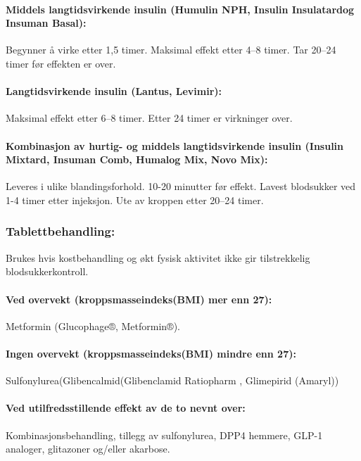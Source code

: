 					\paragraph{Middels langtidsvirkende insulin (Humulin NPH\textregistered, Insulin Insulatard\textregistered og Insuman Basal\textregistered):\\}Begynner å virke etter 1,5 timer. Maksimal effekt etter 4–8 timer. Tar 20–24 timer før effekten er over.

					\paragraph{Langtidsvirkende insulin (Lantus\textregistered, Levimir\textregistered):\\}Maksimal effekt etter 6–8 timer. Etter 24 timer er virkninger over.

					\paragraph{Kombinasjon av hurtig- og middels langtidsvirkende insulin (Insulin Mixtard\textregistered, Insuman Comb\textregistered, Humalog Mix, Novo Mix):\\} Leveres i ulike blandingsforhold. 10-20 minutter før effekt. Lavest blodsukker ved 1-4 timer etter injeksjon. Ute av kroppen etter 20–24 timer.

				\subsubsection{Tablettbehandling:} 
					Brukes hvis kostbehandling og økt fysisk aktivitet ikke gir tilstrekkelig blodsukkerkontroll.

					\paragraph{Ved overvekt (kroppsmasseindeks(BMI) mer enn 27):\\}Metformin (Glucophage®, Metformin®).

					\paragraph{Ingen overvekt (kroppsmasseindeks(BMI) mindre enn 27):\\}Sulfonylurea(Glibencalmid(Glibenclamid Ratiopharm \textregistered, Glimepirid (Amaryl\textregistered))

					\paragraph{Ved utilfredsstillende effekt av de to nevnt over:\\}Kombinasjonsbehandling, tillegg av sulfonylurea, DPP4 hemmere, GLP-1 analoger, glitazoner og/eller akarbose.


